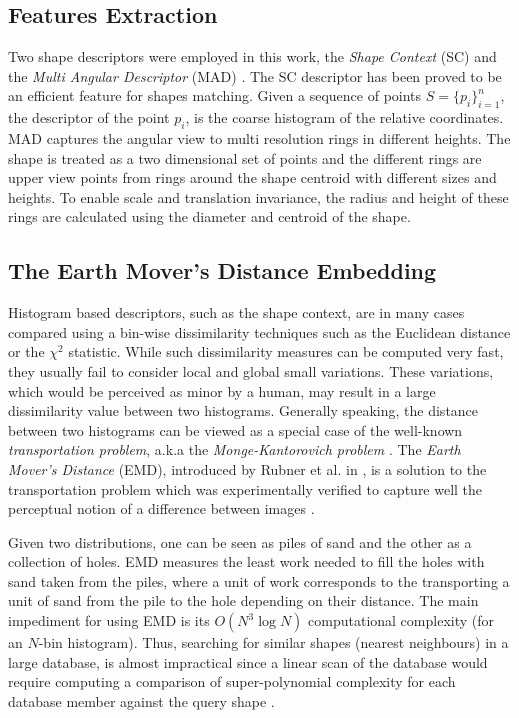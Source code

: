 \documentclass[10pt, conference, compsocconf]{IEEEtran}
\begin{document}
\subsection{Features Extraction}
Two shape descriptors were employed in this work, the \emph{Shape Context} (SC) \cite{belongie2002shape} and the \emph{Multi Angular Descriptor} (MAD) \cite{saabni2013multi}.
The SC descriptor has been proved to be an efficient feature for shapes matching.
Given a sequence of points $S=\{p_i\}_{i=1}^n$, the descriptor of the point ${p_i}$, is the coarse histogram of the relative coordinates.
MAD captures the angular view to multi resolution rings in different heights. 
The shape is treated as a two dimensional set of points and the different rings are upper view points from rings around the shape centroid with different sizes and heights. 
To enable scale and translation invariance, the radius and height of these rings are calculated using the diameter and centroid of the shape.

\subsection{The Earth Mover's Distance Embedding}
Histogram based descriptors, such as the shape context, are in many cases compared using a bin-wise dissimilarity techniques such as the Euclidean distance or the $\chi^2$ statistic.
While such dissimilarity measures can be computed very fast, they usually fail to consider local and global small variations. 
These variations, which would be perceived as minor by a human, may result in a large dissimilarity value between two histograms. 
Generally speaking, the distance between two histograms can be viewed as a special case of the well-known \emph{transportation problem}, a.k.a the \emph{Monge-Kantorovich problem} \cite{rachev1985monge}.
The \emph{Earth Mover's Distance} (EMD), introduced by Rubner et al. in \cite{rubner2000earth}, is a solution to the transportation problem which was experimentally verified to capture well the perceptual notion of a difference between images \cite{grauman2004fast}.

Given two distributions, one can be seen as piles of sand and the other as a collection of holes. 
EMD measures the least work needed to fill the holes with sand taken from the piles, where a unit of work corresponds to the transporting a unit of sand from the pile to the hole depending on their distance.
The main impediment for using EMD is its $O\left( {{N^3}\log N} \right)$ computational complexity (for an $N$-bin histogram). 
Thus, searching for similar shapes (nearest neighbours) in a large database, is almost impractical since a linear scan of the database would require computing a comparison of super-polynomial complexity for each database member against the query shape \cite{saabni2013efficient}. 
\end{document}
